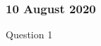 \documentclass[
  a4paper,
  ,captions=tableheading
]{scrartcl}
\begin{document}
\subsubsection{}\label{section-14}

\subsubsection{}\label{section-15}

\subsubsection{}\label{section-16}

\subsubsection{\texorpdfstring{\textbf{10 August
2020}}{10 August 2020}}\label{august-2020}

Question 1
\end{document}
